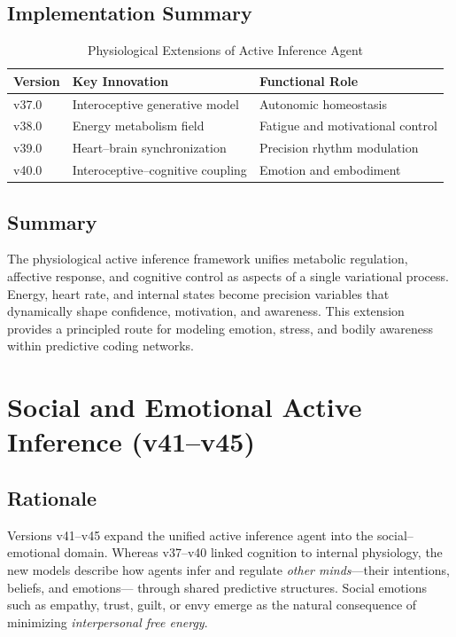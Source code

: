 \documentclass[9pt]{elife}
\begin{document}
\subsection{Implementation Summary}

\begin{table}[h]
\centering
\caption{Physiological Extensions of Active Inference Agent}
\begin{tabular}{l l l}
\hline
Version & Key Innovation & Functional Role \\
\hline
v37.0 & Interoceptive generative model & Autonomic homeostasis \\
v38.0 & Energy metabolism field & Fatigue and motivational control \\
v39.0 & Heart–brain synchronization & Precision rhythm modulation \\
v40.0 & Interoceptive–cognitive coupling & Emotion and embodiment \\
\hline
\end{tabular}
\end{table}

\subsection{Summary}

The physiological active inference framework unifies metabolic regulation,
affective response, and cognitive control as aspects of a single
variational process.
Energy, heart rate, and internal states become precision variables
that dynamically shape confidence, motivation, and awareness.
This extension provides a principled route for modeling
emotion, stress, and bodily awareness within predictive coding networks.

\section{Social and Emotional Active Inference (v41–v45)}

\subsection{Rationale}

Versions v41–v45 expand the unified active inference agent into
the social–emotional domain.
Whereas v37–v40 linked cognition to internal physiology,
the new models describe how agents infer and regulate
\textit{other minds}—their intentions, beliefs, and emotions—
through shared predictive structures.
Social emotions such as empathy, trust, guilt, or envy
emerge as the natural consequence of minimizing
\textit{interpersonal free energy}.
\end{document}
